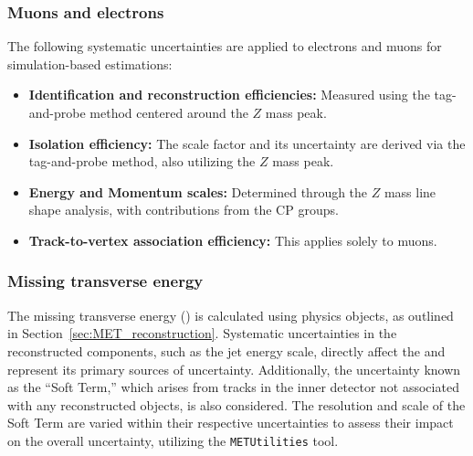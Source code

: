 \subsubsection*{Muons and electrons}
The following systematic uncertainties are applied to electrons and muons for simulation-based estimations:

\begin{itemize}
    \item \textbf{Identification and reconstruction efficiencies:} Measured using the tag-and-probe method centered around the $Z$ mass peak.
    \item \textbf{Isolation efficiency:} The scale factor and its uncertainty are derived via the tag-and-probe method, also utilizing the $Z$ mass peak.
    \item \textbf{Energy and Momentum scales:} Determined through the $Z$ mass line shape analysis, with contributions from the CP groups.
    \item \textbf{Track-to-vertex association efficiency:} This applies solely to muons.
\end{itemize}


\subsubsection*{Missing transverse energy}

The missing transverse energy (\met) is calculated using physics objects, as outlined in Section~\ref{sec:MET_reconstruction}. 
Systematic uncertainties in the reconstructed components, such as the jet energy scale, directly affect the \met and represent its primary sources of uncertainty. Additionally, the uncertainty known as the ``Soft Term,'' which arises from tracks in the inner detector not associated with any reconstructed objects, is also considered. The resolution and scale of the Soft Term are varied within their respective uncertainties to assess their impact on the overall \met uncertainty, utilizing the \texttt{METUtilities} tool.

